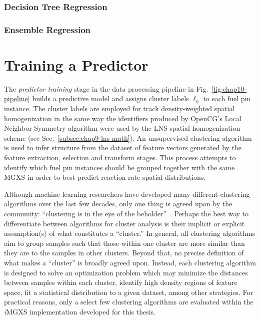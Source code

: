 \subsubsection{Decision Tree Regression}
\label{subsubsec:chap10-decision-trees}

\subsubsection{Ensemble Regression}
\label{subsubsec:chap10-ensemble-methods}


\section{Training a Predictor}
\label{sec:chap10-train-predictor}

The \textit{predictor training} stage in the data processing pipeline in Fig.~\ref{fig:chap10-pipeline} builds a predictive model and assigns cluster labels $\ell_{k}$ to each fuel pin instance. The cluster labels are employed for track density-weighted spatial homogenization in the same way the identifiers produced by OpenCG's Local Neighbor Symmetry algorithm were used by the \ac{LNS} spatial homogenization scheme (see Sec.~\ref{subsec:chap9-lns-math}). An unsupervised clustering algorithm is used to infer structure from the dataset of feature vectors generated by the feature extraction, selection and transform stages. This process attempts to identify which fuel pin instances should be grouped together with the same \ac{MGXS} in order to best predict reaction rate spatial distributions.

Although machine learning researchers have developed many different clustering algorithms over the last few decades, only one thing is agreed upon by the community: ``clustering is in the eye of the beholder''~\cite{castro2002clustering}. Perhaps the best way to differentiate between algorithms for cluster analysis is their implicit or explicit assumption(s) of what constitutes a ``cluster.'' In general, all clustering algorithms aim to group samples such that those within one cluster are more similar than they are to the samples in other clusters. Beyond that, no precise definition of what makes a ``cluster'' is broadly agreed upon. Instead, each clustering algorithm is designed to solve an optimization problem which may minimize the distances between samples within each cluster, identify high density regions of feature space, fit a statistical distribution to a given dataset, among other strategies. For practical reasons, only a select few clustering algorithms are evaluated within the \textit{i}\ac{MGXS} implementation developed for this thesis.

